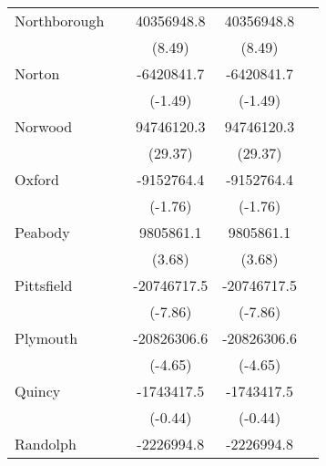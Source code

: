 {\begin{tabular}{l*{4}{c}}
\addlinespace
Northborough        &                     &  40356948.8\sym{***}&  40356948.8\sym{***}&                     \\
                    &                     &      (8.49)         &      (8.49)         &                     \\
\addlinespace
Norton              &                     &  -6420841.7         &  -6420841.7         &                     \\
                    &                     &     (-1.49)         &     (-1.49)         &                     \\
\addlinespace
Norwood             &                     &  94746120.3\sym{***}&  94746120.3\sym{***}&                     \\
                    &                     &     (29.37)         &     (29.37)         &                     \\
\addlinespace
Oxford              &                     &  -9152764.4         &  -9152764.4         &                     \\
                    &                     &     (-1.76)         &     (-1.76)         &                     \\
\addlinespace
Peabody             &                     &   9805861.1\sym{***}&   9805861.1\sym{***}&                     \\
                    &                     &      (3.68)         &      (3.68)         &                     \\
\addlinespace
Pittsfield          &                     & -20746717.5\sym{***}& -20746717.5\sym{***}&                     \\
                    &                     &     (-7.86)         &     (-7.86)         &                     \\
\addlinespace
Plymouth            &                     & -20826306.6\sym{***}& -20826306.6\sym{***}&                     \\
                    &                     &     (-4.65)         &     (-4.65)         &                     \\
\addlinespace
Quincy              &                     &  -1743417.5         &  -1743417.5         &                     \\
                    &                     &     (-0.44)         &     (-0.44)         &                     \\
\addlinespace
Randolph            &                     &  -2226994.8         &  -2226994.8         &                     \\

\end{tabular}}
